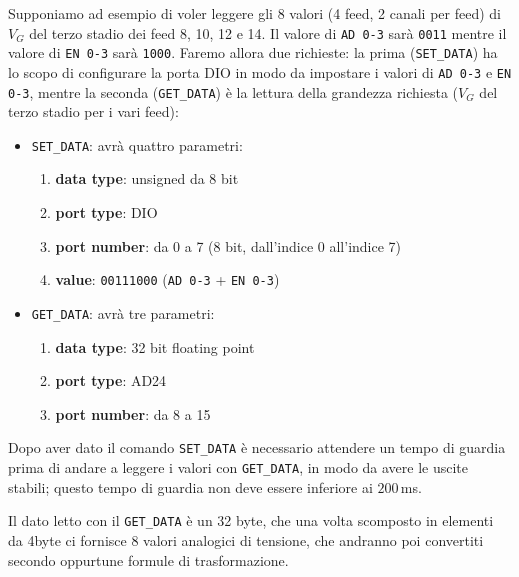 Supponiamo ad esempio di voler leggere gli 8 valori (4 feed, 2 canali per feed) di $V_G$ del terzo 
stadio dei feed 8, 10, 12 e 14. Il valore di \texttt{AD 0-3} sar\`a \texttt{0011} mentre il valore 
di \texttt{EN 0-3} sar\`a \texttt{1000}. Faremo allora due richieste: la prima (\texttt{SET\_DATA}) 
ha lo scopo di configurare la porta DIO in modo da impostare i valori di 
\texttt{AD 0-3} e \texttt{EN 0-3}, mentre la seconda (\texttt{GET\_DATA}) \`e la lettura della 
grandezza richiesta ($V_G$ del terzo stadio per i vari feed):
\begin{itemize}
\item \texttt{SET\_DATA}: avr\`a quattro parametri:
\begin{enumerate}
\item \textbf{data type}: unsigned da 8 bit
\item \textbf{port type}: DIO
\item \textbf{port number}: da 0 a 7 (8 bit, dall'indice 0 all'indice 7)
\item \textbf{value}: \texttt{00111000} (\texttt{AD 0-3} + \texttt{EN 0-3})
\end{enumerate}
\item \texttt{GET\_DATA}: avr\`a tre parametri:
\begin{enumerate}
\item \textbf{data type}: 32 bit floating point
\item \textbf{port type}: AD24
\item \textbf{port number}: da 8 a 15
\end{enumerate}
\end{itemize}
Dopo aver dato il comando \texttt{SET\_DATA} \`e necessario attendere un tempo di guardia prima di
andare a leggere i valori con \texttt{GET\_DATA}, in modo da avere le uscite stabili; questo
tempo di guardia non deve essere inferiore ai $200$\,ms.

Il dato letto con il \texttt{GET\_DATA} \`e un 32 byte, che una volta scomposto in elementi da 4byte ci fornisce
8 valori analogici di tensione, che andranno poi convertiti secondo oppurtune formule di trasformazione.



